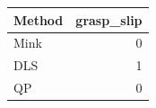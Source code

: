 \begin{tabular}{lr}
\toprule
Method & grasp\_slip\\
\midrule
Mink & 0\\
DLS & 1\\
QP & 0\\
\bottomrule
\end{tabular}
